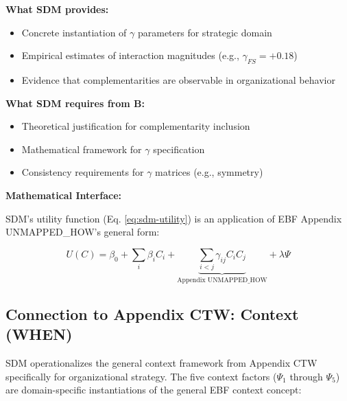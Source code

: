 \begin{tcolorbox}[colback=yellow!5!white, colframe=yellow!75!black,
    title=Integration: SDM $\leftrightarrow$ Appendix UNMAPPED_HOW (HOW)]

\textbf{What SDM provides:}
\begin{itemize}[nosep]
\item Concrete instantiation of $\gamma$ parameters for strategic domain
\item Empirical estimates of interaction magnitudes (e.g., $\gamma_{FS} = +0.18$)
\item Evidence that complementarities are observable in organizational behavior
\end{itemize}

\textbf{What SDM requires from B:}
\begin{itemize}[nosep]
\item Theoretical justification for complementarity inclusion
\item Mathematical framework for $\gamma$ specification
\item Consistency requirements for $\gamma$ matrices (e.g., symmetry)
\end{itemize}

\textbf{Mathematical Interface:}

SDM's utility function (Eq. \ref{eq:sdm-utility}) is an application of EBF Appendix UNMAPPED_HOW's general form:

\begin{equation}
U(C) = \beta_0 + \sum_i \beta_i C_i + \underbrace{\sum_{i<j} \gamma_{ij} C_i C_j}_{\text{Appendix UNMAPPED_HOW}} + \lambda \Psi
\end{equation}

\end{tcolorbox}

\subsection{Connection to Appendix CTW: Context (WHEN)}

SDM operationalizes the general context framework from Appendix CTW specifically for organizational strategy. The five context factors ($\Psi_1$ through $\Psi_5$) are domain-specific instantiations of the general EBF context concept:

